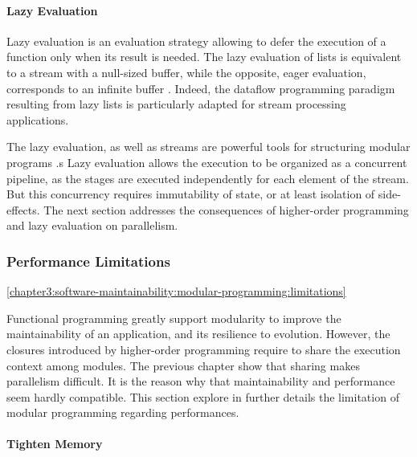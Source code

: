 \paragraph{Lazy Evaluation}

Lazy evaluation is an evaluation strategy allowing to defer the execution of a function only when its result is needed.
The lazy evaluation of lists is equivalent to a stream with a null-sized buffer, while the opposite, eager evaluation, corresponds to an infinite buffer \cite{VanRoy2003}.
Indeed, the dataflow programming paradigm resulting from lazy lists is particularly adapted for stream processing applications.

The lazy evaluation, as well as streams are powerful tools for structuring modular programs \cite{Sussman1983}.s
Lazy evaluation allows the execution to be organized as a concurrent pipeline, as the stages are executed independently for each element of the stream.
But this concurrency requires immutability of state, or at least isolation of side-effects.
The next section addresses the consequences of higher-order programming and lazy evaluation on parallelism.


\subsubsection{Performance Limitations} \ref{chapter3:software-maintainability:modular-programming:limitations}

Functional programming greatly support modularity to improve the maintainability of an application, and its resilience to evolution.
However, the closures introduced by higher-order programming require to share the execution context among modules.
The previous chapter show that sharing makes parallelism difficult.
It is the reason why that maintainability and performance seem hardly compatible.
This section explore in further details the limitation of modular programming regarding performances.

\paragraph{Tighten Memory}

